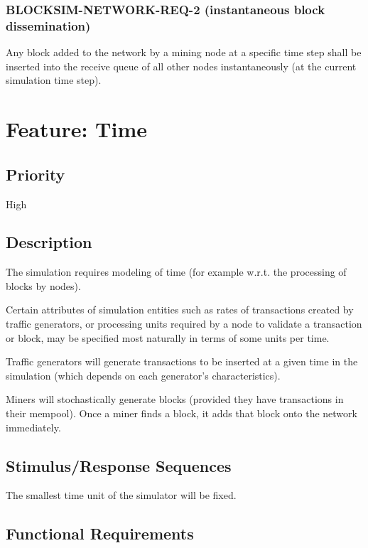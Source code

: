 \documentclass{scrreprt}
\begin{document}
\subsubsection{BLOCKSIM-NETWORK-REQ-2 (instantaneous block dissemination)}

Any block added to the network by a mining node at a specific time step shall be inserted into the receive
queue of all other nodes instantaneously (at the current simulation time step).



\section{Feature: Time}

\subsection{Priority}

High


\subsection{Description}

The simulation requires modeling of time (for example w.r.t. the
processing of blocks by nodes).

Certain attributes of simulation entities such as rates of transactions
created by traffic generators, or processing units required by a node
to validate a transaction or block, may be specified most naturally in terms
of some units per time.

Traffic generators will generate transactions to be inserted at a given time
in the simulation (which depends on each generator's characteristics).

Miners will stochastically generate blocks (provided they have transactions
in their mempool). Once a miner finds a block, it adds that block onto
the network immediately.


\subsection{Stimulus/Response Sequences}

The smallest time unit of the simulator will be fixed.


\subsection{Functional Requirements}
\end{document}
